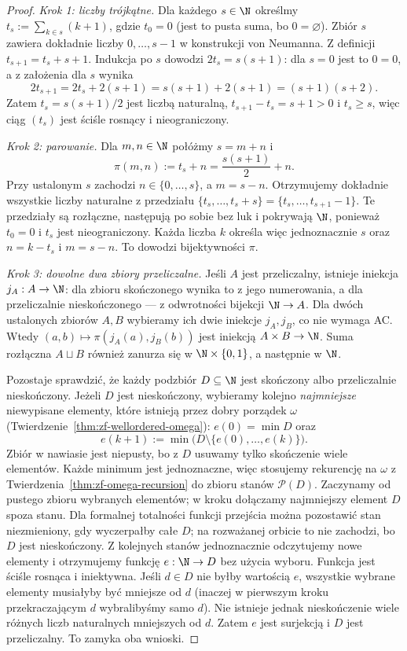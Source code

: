\begin{proof}
\emph{Krok 1: liczby trójkątne.}
Dla każdego $s\in\N$ określmy
$t_s:=\sum_{k\in s}(k+1)$, gdzie $t_0=0$
(jest to pusta suma, bo $0=\varnothing$).
Zbiór $s$ zawiera dokładnie liczby $0,\ldots,s-1$
w konstrukcji von Neumanna.
Z definicji $t_{s+1}=t_s+s+1$.
Indukcja po $s$ dowodzi $2t_s=s(s+1)$:
dla $s=0$ jest to $0=0$, a z założenia dla $s$
wynika
\[
2t_{s+1}=2t_s+2(s+1)
=s(s+1)+2(s+1)=(s+1)(s+2).
\]
Zatem $t_s=s(s+1)/2$ jest liczbą naturalną,
$t_{s+1}-t_s=s+1>0$ i $t_s\ge s$,
więc ciąg $(t_s)$ jest ściśle rosnący
i nieograniczony.

\emph{Krok 2: parowanie.}
Dla $m,n\in\N$ połóżmy $s=m+n$ i
\[
\pi(m,n):=t_s+n=\frac{s(s+1)}2+n.
\]
Przy ustalonym $s$ zachodzi $n\in\{0,\ldots,s\}$,
a $m=s-n$. Otrzymujemy dokładnie wszystkie
liczby naturalne z przedziału
$\{t_s,\ldots,t_s+s\}=\{t_s,\ldots,t_{s+1}-1\}$.
Te przedziały są rozłączne, następują po sobie
bez luk i pokrywają $\N$, ponieważ $t_0=0$
i $t_s$ jest nieograniczony.
Każda liczba $k$ określa więc jednoznacznie
$s$ oraz $n=k-t_s$ i $m=s-n$.
To dowodzi bijektywności $\pi$.

\emph{Krok 3: dowolne dwa zbiory przeliczalne.}
Jeśli $A$ jest przeliczalny, istnieje iniekcja
$j_A:A\to\N$: dla zbioru skończonego wynika to
z jego numerowania, a dla przeliczalnie
nieskończonego --- z odwrotności bijekcji $\N\to A$.
Dla dwóch ustalonych zbiorów $A,B$ wybieramy
ich dwie iniekcje $j_A,j_B$, co nie wymaga AC.
Wtedy $(a,b)\mapsto\pi(j_A(a),j_B(b))$
jest iniekcją $A\times B\to\N$.
Suma rozłączna $A\sqcup B$ również zanurza się w
$\N\times\{0,1\}$, a następnie w $\N$.

Pozostaje sprawdzić, że każdy podzbiór $D\subseteq\N$
jest skończony albo przeliczalnie nieskończony.
Jeżeli $D$ jest nieskończony, wybieramy kolejno
\emph{najmniejsze} niewypisane elementy,
które istnieją przez dobry porządek $\omega$
(Twierdzenie~\ref{thm:zf-wellordered-omega}):
$e(0)=\min D$ oraz
\[
e(k+1):=\min\bigl(D\setminus
\{e(0),\ldots,e(k)\}\bigr).
\]
Zbiór w nawiasie jest niepusty, bo z $D$
usuwamy tylko skończenie wiele elementów.
Każde minimum jest jednoznaczne,
więc stosujemy rekurencję na $\omega$
z Twierdzenia~\ref{thm:zf-omega-recursion}
do zbioru stanów $\mathcal P(D)$.
Zaczynamy od pustego zbioru wybranych elementów;
w kroku dołączamy najmniejszy element $D$
spoza stanu. Dla formalnej totalności funkcji
przejścia można pozostawić stan niezmieniony,
gdy wyczerpałby całe $D$; na rozważanej
orbicie to nie zachodzi, bo $D$ jest nieskończony.
Z kolejnych stanów jednoznacznie odczytujemy
nowe elementy i otrzymujemy funkcję
$e:\N\to D$ bez użycia wyboru.
Funkcja jest ściśle rosnąca i iniektywna.
Jeśli $d\in D$ nie byłby wartością $e$,
wszystkie wybrane elementy musiałyby być
mniejsze od $d$ (inaczej w pierwszym kroku
przekraczającym $d$ wybralibyśmy samo $d$).
Nie istnieje jednak nieskończenie wiele
różnych liczb naturalnych mniejszych od $d$.
Zatem $e$ jest surjekcją i $D$ jest przeliczalny.
To zamyka oba wnioski.
\end{proof}

